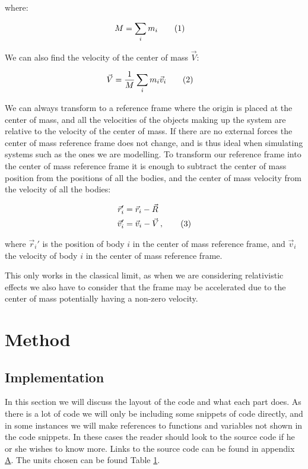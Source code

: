 \documentclass[reprint,english,notitlepage]{revtex4-1}  %
\newcommand\numberthis{\addtocounter{equation}{1}\tag{\theequation}}
\begin{document}
where:

\begin{align*}
M &= \sum\limits_i m_i \numberthis \label{eq:tot_mass}
\end{align*}

We can also find the velocity of the center of mass $\vec{V}$:

\begin{align*}
\vec{V} &= \frac{1}{M} \sum\limits_i m_i \vec{v}_i \numberthis \label{eq:cofm_vel}
\end{align*}

We can always transform to a reference frame where the origin is placed at the center of mass, and all the velocities of the objects making up the system are relative to the velocity of the center of mass. If there are no external forces the center of mass reference frame does not change, and is thus ideal when simulating systems such as the ones we are modelling. To transform our reference frame into the center of mass reference frame it is enough to subtract the center of mass position from the positions of all the bodies, and the center of mass velocity from the velocity of all the bodies:

\begin{align*}
\vec{r}_i' &= \vec{r}_i - \vec{R} \\
\vec{v}_i' &= \vec{v}_i - \vec{V} \, , \numberthis \label{eq:cofm_transform}
\end{align*}

where $\vec{r}_i'$ is the position of body $i$ in the center of mass reference frame, and $\vec{v}_i$ the velocity of body $i$ in the center of mass reference frame.

This only works in the classical limit, as when we are considering relativistic effects we also have to consider that the frame may be accelerated due to the center of mass potentially having a non-zero velocity.
\newpage \newpage



\section{Method} \label{sec:III}

\subsection{Implementation} \label{sec:III:a}

In this section we will discuss the layout of the code and what each part does. As there is a lot of code we will only be including some snippets of code directly, and in some instances we will make references to functions and variables not shown in the code snippets. In these cases the reader should look to the source code if he or she wishes to know more. Links to the source code can be found in appendix \hyperref[A]{A}. The units chosen can be found Table \hyperref[table:III:a:i]{1}.
\end{document}
